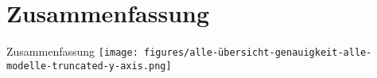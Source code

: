 \documentclass[aspectratio=169]{beamer} %
\begin{document}





\section{Zusammenfassung}

\begin{frame}{Zusammenfassung}
    \centering
    \texttt{[image: figures/alle-übersicht-genauigkeit-alle-modelle-truncated-y-axis.png]}
\end{frame}
\end{document}
